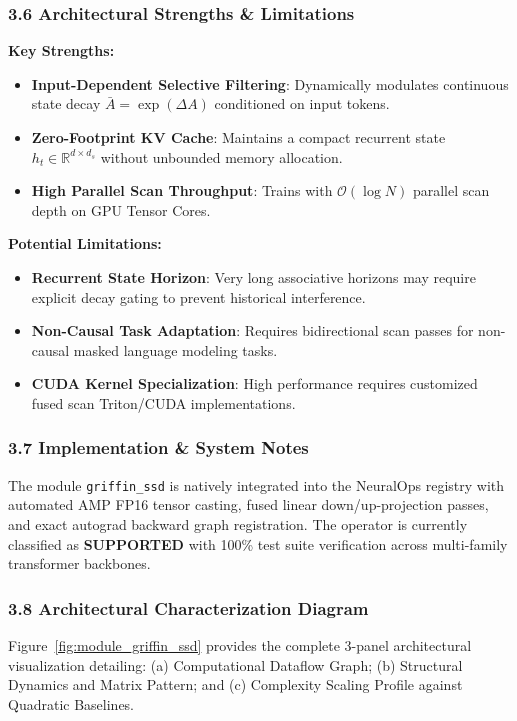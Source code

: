 \subsubsection*{3.6 Architectural Strengths \& Limitations}
\textbf{Key Strengths:}
\begin{itemize}
    \item \textbf{Input-Dependent Selective Filtering}: Dynamically modulates continuous state decay $\bar{A} = \exp(\Delta A)$ conditioned on input tokens.
    \item \textbf{Zero-Footprint KV Cache}: Maintains a compact recurrent state $h_t \in \mathbb{R}^{d \times d_s}$ without unbounded memory allocation.
    \item \textbf{High Parallel Scan Throughput}: Trains with $\mathcal{O}(\log N)$ parallel scan depth on GPU Tensor Cores.
\end{itemize}

\textbf{Potential Limitations:}
\begin{itemize}
    \item \textbf{Recurrent State Horizon}: Very long associative horizons may require explicit decay gating to prevent historical interference.
    \item \textbf{Non-Causal Task Adaptation}: Requires bidirectional scan passes for non-causal masked language modeling tasks.
    \item \textbf{CUDA Kernel Specialization}: High performance requires customized fused scan Triton/CUDA implementations.
\end{itemize}

\subsubsection*{3.7 Implementation \& System Notes}
The module \texttt{griffin\_ssd} is natively integrated into the NeuralOps registry with automated AMP FP16 tensor casting, fused linear down/up-projection passes, and exact autograd backward graph registration. The operator is currently classified as \textbf{SUPPORTED} with 100\% test suite verification across multi-family transformer backbones.

\subsubsection*{3.8 Architectural Characterization Diagram}
Figure~\ref{fig:module_griffin_ssd} provides the complete 3-panel architectural visualization detailing: (a) Computational Dataflow Graph; (b) Structural Dynamics and Matrix Pattern; and (c) Complexity Scaling Profile against Quadratic Baselines.

